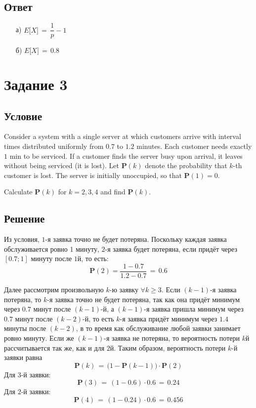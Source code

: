 \documentclass{article}
\begin{document}
\subsection*{Ответ}
\begin{enumerate}
\item[а)] $ E \big[ X \big] \, = \, \dfrac{1}{p} \! - \! 1 $
\item[б)] $ E \big[ X \big] \, = \, 0.8 $
\end{enumerate}
\section*{Задание 3}
\subsection*{Условие}
Consider a system with a single server at which customers arrive with interval times distributed uniformly from $ 0.7 $ to $ 1.2 $ minutes. Each customer needs exactly $ 1 $ min to be serviced. If a customer finds the server busy upon arrival, it leaves without being serviced (it is lost). Let $ \mathbf{P} (k) $ denote the probability that $ k $-th customer is lost. The server is initially unoccupied, so that $ \mathbf{P} (1) \! = \! 0 $.\par
Calculate $ \mathbf{P} (k) $ for $ k \! = \! 2,3,4 $ and find $ \mathbf{P} (k) $.
\subsection*{Решение}
Из условия, $ 1 $-я заявка точно не будет потеряна. Поскольку каждая заявка обслуживается ровно 1 минуту, $ 2 $-я заявка будет потеряна, если придёт через $ [0.7;1] $ минуту после $ 1 $й, то есть:
\[ \mathbf{P} (2) \! = \! \dfrac{1 \! - \! 0.7}{1.2 \! - \! 0.7} \, = \, 0.6 \]\par
Далее рассмотрим произвольную $ k $-ю заявку $ \forall k \! \geqslant \! 3 $. Если $ (k \! - \! 1) $-я заявка потеряна, то $ k $-я заявка точно не будет потеряна, так как она придёт минимум через $ 0.7 $ минут после $ (k \! - \! 1) $-й, а $ (k \! - \! 1) $-я заявка пришла минимум через $ 0.7 $ минут после $ (k \! - \! 2) $-й, то есть $ k $-я заявка придёт минимум через $ 1.4 $ минуты после $ (k \! - \! 2) $, в то время как обслуживание любой заявки занимает ровно минуту. Если же $ (k \! - \! 1) $-я заявка не потеряна, то вероятность потери $ k $й рассчитывается так же, как и для $ 2 $й. Таким образом, вероятность потери $ k $-й заявки равна
\[ \mathbf{P}(k) \, = \, \Big( 1 \! - \! \mathbf{P}(k \! - \! 1) \Big) \! \cdot \! \mathbf{P}(2) \]
Для $ 3 $-й заявки:
\[ \mathbf{P}(3) \, = \, (1 \! - \! 0.6) \! \cdot \! 0.6 \, = \, 0.24 \]
Для $ 2 $-й заявки:
\[ \mathbf{P}(4) \, = \, (1 \! - \! 0.24) \! \cdot \! 0.6 \, = \, 0.456 \]
\end{document}
